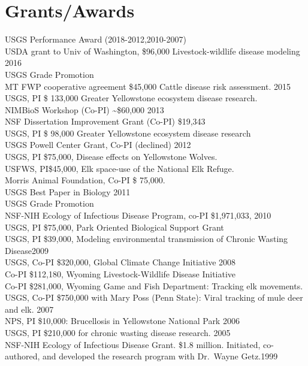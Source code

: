 \documentclass[12pt,]{article}
\begin{document}
\hypertarget{grantsawards}{%
\section{Grants/Awards}\label{grantsawards}}

USGS Performance Award (2018-2012,2010-2007)\\
USDA grant to Univ of Washington, \$96,000 Livestock-wildlife disease
modeling \hfill 2016\\
USGS Grade Promotion\\
MT FWP cooperative agreement \$45,000 Cattle disease risk assessment.
\hfill 2015\\
USGS, PI \$ 133,000 Greater Yellowstone ecosystem disease research.\\
NIMBioS Workshop (Co-PI) \textasciitilde{}\$60,000 \hfill 2013\\
NSF Dissertation Improvement Grant (Co-PI) \$19,343\\
USGS, PI \$ 98,000 Greater Yellowstone ecosystem disease research\\
USGS Powell Center Grant, Co-PI (declined) \hfill 2012\\
USGS, PI \$75,000, Disease effects on Yellowstone Wolves.\\
USFWS, PI\$45,000, Elk space-use of the National Elk Refuge.\\
Morris Animal Foundation, Co-PI \$ 75,000.\\
USGS Best Paper in Biology \hfill 2011\\
USGS Grade Promotion\\
NSF-NIH Ecology of Infectious Disease Program, co-PI \$1,971,033,
\hfill 2010\\
USGS, PI \$75,000, Park Oriented Biological Support Grant\\
USGS, PI \$39,000, Modeling environmental transmission of Chronic
Wasting Disease\hfill 2009\\
USGS, Co-PI \$320,000, Global Climate Change Initiative \hfill 2008\\
Co-PI \$112,180, Wyoming Livestock-Wildlife Disease Initiative\\
Co-PI \$281,000, Wyoming Game and Fish Department: Tracking elk
movements.\\
USGS, Co-PI \$750,000 with Mary Poss (Penn State): Viral tracking of
mule deer and elk. \hfill 2007\\
NPS, PI \$10,000: Brucellosis in Yellowstone National Park \hfill 2006\\
USGS, PI \$210,000 for chronic wasting disease research. \hfill 2005\\
NSF-NIH Ecology of Infectious Disease Grant. \$1.8 million. Initiated,
co-authored, and developed the research program with Dr.~Wayne
Getz.\hfill 1999
\end{document}
